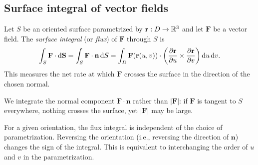 \documentclass[a4paper]{article}
\begin{document}
\subsection{Surface integral of vector fields}
\begin{defi}
  Let $S$ be an oriented surface parametrized by $\mathbf{r}: D \to \mathbb{R}^3$ and let $\mathbf{F}$ be a vector field. The \emph{surface integral} (or \emph{flux}) of $\mathbf{F}$ through $S$ is
  \[
    \int_S \mathbf{F} \cdot \mathrm{d}\mathbf{S} = \int_S \mathbf{F} \cdot \mathbf{n} \, \mathrm{d} S = \int_D \mathbf{F}(\mathbf{r}(u, v)) \cdot \left( \frac{\partial \mathbf{r}}{\partial u} \times \frac{\partial \mathbf{r}}{\partial v} \right) \mathrm{d} u \, \mathrm{d} v.
  \]
  This measures the net rate at which $\mathbf{F}$ crosses the surface in the direction of the chosen normal.
\end{defi}

\begin{rmk}
  We integrate the normal component $\mathbf{F} \cdot \mathbf{n}$ rather than $|\mathbf{F}|$: if $\mathbf{F}$ is tangent to $S$ everywhere, nothing crosses the surface, yet $|\mathbf{F}|$ may be large.
\end{rmk}

\begin{rmk}
  For a given orientation, the flux integral is independent of the choice of parametrization. Reversing the orientation (i.e., reversing the direction of $\mathbf{n}$) changes the sign of the integral. This is equivalent to interchanging the order of $u$ and $v$ in the parametrization.
\end{rmk}
\end{document}
